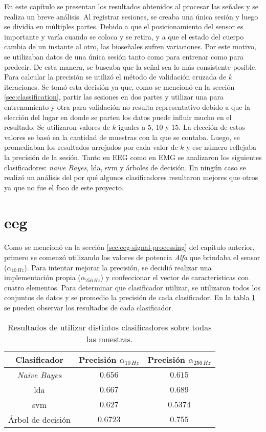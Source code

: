En este capítulo se presentan los resultados obtenidos al procesar las señales y se realiza un breve análisis. Al registrar sesiones,  se creaba una única sesión y luego se dividía en múltiples partes. Debido a que el posicionamiento del sensor es importante y varía cuando se coloca y se retira,  y a que el estado del cuerpo cambia de un instante al otro, las bioseñales sufren variaciones. Por este motivo, se utilizaban datos de una única sesión tanto como para entrenar como para predecir. De esta manera, se buscaba que la señal sea lo más consistente posible. Para calcular la precisión se utilizó el método de validación cruzada de $k$ iteraciones. Se tomó esta decisión ya que, como se mencionó en la sección \ref{sec:classification}, partir las sesiones en dos partes y utilizar una para entrenamiento y otra para validación no resulta representativo debido a que la elección del lugar en donde se parten los datos puede influir mucho en el resultado. Se utilizaron valores de $k$ iguales a $5$, $10$ y $15$. La elección de estos valores se basó en la cantidad de muestras con la que se contaba. Luego, se promediaban los resultados arrojados por cada valor de $k$ y ese número reflejaba la precisión de la sesión. Tanto en EEG como en EMG se analizaron los siguientes clasificadores: \emph{naive Bayes},  \acrshort{lda}, \gls{svm} y árboles de decisión. En ningún caso se realizó un análisis del por qué algunos clasificadores resultaron mejores que otros ya que no fue el foco de este proyecto.

\section{\acrshort{eeg}} \label{sec:eeg-results}

Como se mencionó en la sección \ref{sec:eeg-signal-processing} del capítulo anterior, primero se comenzó utilizando los valores de potencia \emph{Alfa} que brindaba el sensor ($\alpha_{10 \, Hz}$). Para intentar mejorar la precisión, se decidió realizar una implementación propia ($\alpha_{256 \, Hz}$) y confeccionar el vector de características con cuatro elementos. Para determinar que clasificador utilizar, se utilizaron todos los conjuntos de datos y se promedio la precisión de cada clasificador. En la tabla \ref{tab:eeg-class-result} se pueden observar los resultados de cada clasificador.
 
\begin{table}[H]
\centering
\begin{tabular}{ |c|c|c| } 
 \hline
 Clasificador & Precisión $\alpha_{10 \, Hz}$ &  Precisión $\alpha_{256 \, Hz}$ \\ 
 \hline
 \emph{Naive Bayes} & $0.656$  & $0.615$  \\
 \hline
 \gls{lda}  & $0.667$ & $0.689$ \\
  \hline
  \gls{svm} & $0.627$ & $0.5374$ \\
  \hline
 Árbol de decisión & $0.6723$ & $0.755$ \\
 \hline
\end{tabular}
\caption{Resultados de utilizar distintos clasificadores sobre todas las muestras.}
\label{tab:eeg-class-result}
\end{table}

